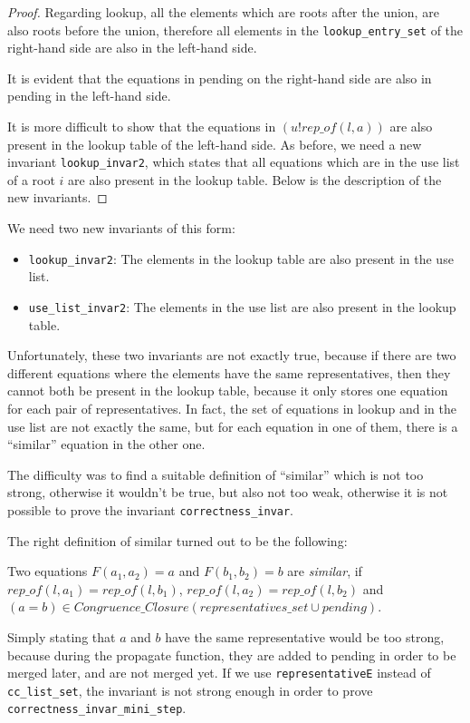\begin{proof}
Regarding lookup, all the elements which are roots after the union, are also roots before the union, therefore all elements in the \lstinline{lookup_entry_set} of the right-hand side are also in the left-hand side.

It is evident that the equations in pending on the right-hand side are also in pending in the left-hand side.

It is more difficult to show that the equations in $(u ! rep\_of(l, a))$ are also present in the lookup table of the left-hand side. As before, we need a new invariant \lstinline{lookup_invar2}, which states that all equations which are in the use list of a root $i$ are also present in the lookup table. Below is the description of the new invariants.
\end{proof}

We need two new invariants of this form:
\begin{itemize}
    \item \lstinline{lookup_invar2}: The elements in the lookup table are also present in the use list.
	\item \lstinline{use_list_invar2}: The elements in the use list are also present in the lookup table.
\end{itemize}

Unfortunately, these two invariants are not exactly true, because if there are two different equations where the elements have the same representatives, then they cannot both be present in the lookup table, because it only stores one equation for each pair of representatives. In fact, the set of equations in lookup and in the use list are not exactly the same, but for each equation in one of them, there is a ``similar'' equation in the other one.

The difficulty was to find a suitable definition of ``similar'' which is not too strong, otherwise it wouldn't be true, but also not too weak, otherwise it is not possible to prove the invariant \lstinline{correctness_invar}.

The right definition of similar turned out to be the following:

\begin{definition}
Two equations $F(a_1, a_2) = a$ and $F(b_1, b_2) = b$ are \emph{similar}, if $rep\_of(l, a_1) = rep\_of(l, b_1)$, $rep\_of(l, a_2) = rep\_of(l, b_2)$ and $(a=b) \in Congruence\_Closure (representatives\_set \cup pending)$.
\end{definition}

Simply stating that $a$ and $b$ have the same representative would be too strong, because during the propagate function, they are added to pending in order to be merged later, and are not merged yet. If we use \lstinline{representativeE} instead of \lstinline{cc_list_set}, the invariant is not strong enough in order to prove \lstinline{correctness_invar_mini_step}.

